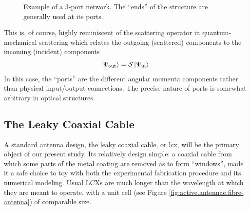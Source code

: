 \begin{figure}
 \begin{center}
 \end{center}
 \caption[Example of a 3-port network]{Example of a 3-port network. The ``ends'' of the structure are generally used at its ports.}
 \label{fig:active.antennae.network}
\end{figure} 

This is, of course, highly reminiscent of the scattering operator
in quantum-mechanical scattering which relates the outgoing (scattered)
components to the incoming (incident) components
  \begin{equation}
   \Ket{\Psi_\text{out}}=\mathcal{S}\Ket{\Psi_\text{in}}.
  \end{equation}
In this case, the ``ports'' are the different angular momenta
components rather than physical input/output connections. 
The precise nature of ports is somewhat arbitrary in optical structures.

\subsection{The Leaky Coaxial Cable}
A standard antenna design, the leaky coaxial cable, or \gls{lcx}, will be the primary 
object of our present study. Its relatively design simple: a coaxial cable from which
some parts of the metal coating are removed as to form ``windows'', made it a safe choice
to toy with both the experimental fabrication procedure and its numerical modeling. 
Usual LCXs are much longer than the wavelength at which they are meant to operate, with 
a unit cell (see Figure \ref{fig:active.antennae.fibre-antenna}) of comparable size.

